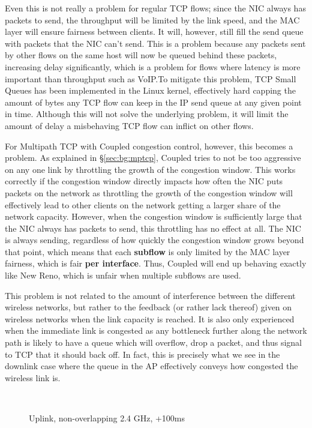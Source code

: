 Even this is not really a problem for regular TCP flows; since the NIC always
has packets to send, the throughput will be limited by the link speed, and the
MAC layer will ensure fairness between clients. It will, however, still fill the
send queue with packets that the NIC can't send. This is a problem because any
packets sent by other flows on the same host will now be queued behind these
packets, increasing delay significantly, which is a problem for flows where
latency is more important than throughput such as VoIP.\@ To mitigate this 
problem, TCP Small Queues has been implemented in the Linux kernel, effectively 
hard capping the amount of bytes any TCP flow can keep in the IP send queue at 
any given point in time. Although this will not solve the underlying problem, it 
will limit the amount of delay a misbehaving TCP flow can inflict on other flows.

For Multipath TCP with Coupled congestion control, however, this becomes a
problem. As explained in \S\ref{sec:bg:mptcp}, Coupled tries to not be too 
aggressive on any one link by throttling the growth of the congestion window.
This works correctly if the congestion window directly impacts how often the NIC 
puts packets on the network as throttling the growth of the congestion window 
will effectively lead to other clients on the network getting a larger share of 
the network capacity. However, when the congestion window is sufficiently large 
that the NIC always has packets to send, this throttling has no effect at all. 
The NIC is always sending, regardless of how quickly the congestion window grows 
beyond that point, which means that each \textbf{subflow} is only limited by the 
MAC layer fairness, which is fair \textbf{per interface}. Thus, Coupled will end 
up behaving exactly like New Reno, which is unfair when multiple subflows are 
used.

This problem is not related to the amount of interference between the different
wireless networks, but rather to the feedback (or rather lack thereof) given on
wireless networks when the link capacity is reached. It is also only experienced
when the immediate link is congested as any bottleneck further along the network
path is likely to have a queue which will overflow, drop a packet, and thus
signal to TCP that it should back off. In fact, this is precisely what we see in
the downlink case where the queue in the AP effectively conveys how congested
the wireless link is.

\begin{figure}[h]
 \centering
 \subfloat[][CDF] {\
   \label{graph:fairness-rtt-up-cdf}
 }
 \\
 \subfloat[][Multipath TCP time plot] {\
   \label{graph:fairness-rtt-up-close}
 }
 \caption{Uplink, non-overlapping 2.4 GHz, +100ms}\label{graph:fairness-rtt-up}
\end{figure}

